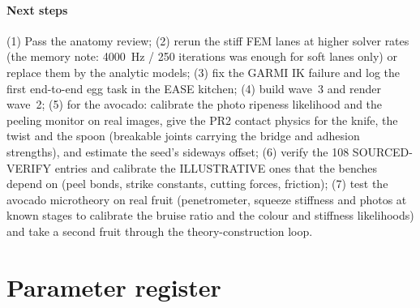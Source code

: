 \documentclass[10.5pt,a4paper]{article}
\begin{document}
\paragraph{Next steps} (1) Pass the anatomy review; (2) rerun the stiff FEM lanes at higher solver rates (the
memory note: 4000~Hz / 250 iterations was enough for soft lanes only) or replace them by the analytic models; (3) fix
the GARMI IK failure and log the first end-to-end egg task in the EASE kitchen; (4) build wave~3 and render wave~2;
(5) for the avocado: calibrate the photo ripeness likelihood and the peeling monitor on real images, give the PR2
contact physics for the knife, the twist and the spoon (breakable joints carrying the bridge and adhesion strengths),
and estimate the seed's sideways offset; (6) verify the 108 SOURCED-VERIFY entries and calibrate the ILLUSTRATIVE ones that
the benches depend on (peel bonds, strike constants, cutting forces, friction); (7) test the avocado microtheory on
real fruit (penetrometer, squeeze stiffness and photos at known stages to calibrate the bruise ratio and the colour
and stiffness likelihoods) and take a second fruit through the theory-construction loop.
\clearpage\appendix\section{Parameter register}\label{app:register}
\end{document}

